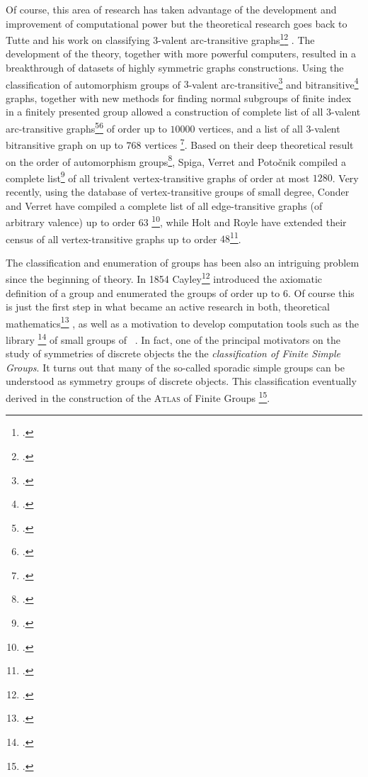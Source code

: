 Of course, this area of research has taken advantage of the development and improvement of computational power but the theoretical research goes back to Tutte and his work on classifying $3$-valent arc-transitive graphs\footcite{Tutte_1947_FamilyCubicalGraphs}\footcite{Tutte_1959_SymmetryCubicGraphs} .
The development of the theory, together with more powerful computers, resulted in a breakthrough of datasets of highly symmetric graphs constructions.
Using the classification of automorphism groups of $3$-valent
arc-transitive\footcite{DjokovicMiller_1980_RegularGroupsAutomorphisms} and bitransitive\footcite{Goldschmidt_1980_AutomorphismsTrivalentGraphs} graphs, together with new methods for finding normal subgroups of finite index in a finitely presented group allowed a construction of complete list of all $3$-valent arc-transitive graphs\footcite{ConderDobcsanyi_2002_TrivalentSymmetricGraphs}\footcite{Conder__TrivalentCubicSymmetric}  of order up to $10 000$ vertices, and a list of all $3$-valent bitransitive graph on up to $768$ vertices \footcite{ConderMalnicMarusicPotocnik_2006_CensusSemisymmetricCubic}.
Based on their deep theoretical result on the order of automorphism groups\footcite{PotocnikSpigaVerret_2015_BoundingOrderVertex}, Spiga, Verret and Potočnik compiled a complete list\footcite{PotocnikSpigaVerret_2015_Census4Valent}  of all trivalent vertex-transitive graphs of order at most $1280$.
Very recently, using the database of vertex-transitive groups of small degree, Conder and Verret have compiled a complete list of all edge-transitive graphs (of arbitrary valence) up to order $63$ \footcite{ConderVerret_2019_EdgeTransitiveGraphs}, while
Holt and Royle have extended their census of all vertex-transitive graphs up to order $48$\footcite{HoltRoyle_2020_CensusSmallTransitive}.

The classification and enumeration of groups has been also an intriguing problem since the beginning of theory.
In 1854 Cayley\footcite{Cayley_1854_Vii.TheoryGroups} introduced the axiomatic definition of a group and enumerated the groups of order up to $6$.
Of course this is just the first step in what became an active research in both, theoretical mathematics\footcite{BlackburnNeumannVenkataraman_2007_EnumerationFiniteGroups} , as well as a motivation to develop computation tools such as the library \smallgrp \footcite{BescheEickOBrien_2001_GroupsOrderMost} of small groups of \gap\ .
In fact, one of the principal motivators on the study of symmetries of discrete objects the the \emph{classification of Finite Simple Groups}. It turns out that many of the so-called sporadic simple groups can be understood as symmetry groups of discrete objects.
This classification eventually derived in the construction of the \textsc{Atlas} of Finite Groups \footcite{Conway_1986_AtlasFiniteGroups}.

